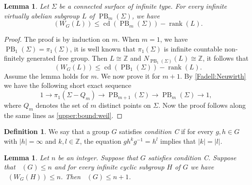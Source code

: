 \documentclass[a4paper,12pt,leqno]{amsart}
\newtheorem{lemma}[theorem]{Lemma}
\theoremstyle{definition}
\newtheorem{definition}[theorem]{Definition}
\newcommand{\Z}{\mathbb{Z}}
\newcommand{\calF}{{\mathcal F}}
\DeclareMathOperator{\cd}{cd}
\DeclareMathOperator{\gdfin}{gd_{\calF_0}}
\DeclareMathOperator{\gdvc}{\underline{\underline{gd}}}
\DeclareMathOperator{\pb}{PB}
\DeclareMathOperator{\rank}{rank}
\begin{document}
\begin{lemma}\label{upper:bound:weil:infinite:type}
Let \( \Sigma \) be a connected surface of infinite type. For every infinite virtually abelian subgroup \( L \) of \( \pb_{m}(\Sigma) \), we have 
\[
\gdfin(W_G(L)) \leq \cd(\pb_{m}(\Sigma)) - \rank(L).
\]
\end{lemma}
\begin{proof}
 The proof is by induction on $m$. When \( m = 1 \), we have \( \pb_1(\Sigma) = \pi_1(\Sigma) \), it is well known that \( \pi_1(\Sigma) \) is infinite countable non-finitely generated free group. Then $L\cong \Z$ and $N_{\pb_1(\Sigma)}(L)\cong \Z$, it follows that   \[
\gdfin(W_G(L)) \leq \cd(\pb_{1}(\Sigma)) - \rank(L).
\]
 Assume the lemma holds for \( m \). We now prove it for \( m + 1 \). By \cref{Fadell:Neuwirth} we have the following short exact sequence
\[
1 \to \pi_1(\Sigma - Q_m) \to \pb_{m+1}(\Sigma) \to \pb_m(\Sigma) \to 1,
\]
where \( Q_m \) denotes the set of \( m \) distinct points on \( \Sigma \). Now the proof follows along the same lines as \cref{upper:bound:weil}.
\end{proof}

\begin{definition}\cite[Condition 4.1]{MR2545612}
We say that a group \( G \) satisfies \emph{condition C} if for every \( g,h \in G \) with \( |h| = \infty \) and \( k,l \in \mathbb{Z} \), the equation \( gh^k g^{-1} = h^l \) implies that \( |k| = |l| \).
\end{definition}


\begin{lemma}\cite[Lemma 4.4]{MR2545612}\label{luck:condition:C}
 Let $n$ be an integer. Suppose  that $G$ satisfies condition C. Suppose that $\gdfin(G)\leq n$ and for every infinite cyclic subgroup $H$ of $G$ we have $\gdfin(W_G(H))\leq n$. Then $\gdvc(G)\leq n+1$.  
\end{lemma}
\end{document}

